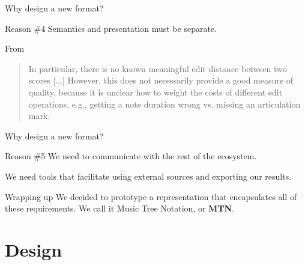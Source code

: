 \documentclass[UKenglish, aspectratio = 169]{beamer}
\begin{document}

\begin{frame}[c]{Why design a new format?}
	\begin{alertblock}{Reason \#4}
		Semantics and presentation must be separate.
	\end{alertblock}
	
	From \cite{calvo-zaragoza_understanding_2021}
	
	\begin{quote}
		In particular, there is no known meaningful edit distance between two 
		scores 
		[...] However, this does not necessarily provide a good measure of quality, 
		because it is unclear how to weight the costs of different edit operations, 
		e.g., getting a note duration wrong vs. missing an articulation mark.
	\end{quote}
\end{frame}


\begin{frame}[c]{Why design a new format?}
	\begin{alertblock}{Reason \#5}
		We need to communicate with the rest of the ecosystem.
	\end{alertblock}
	
	We need tools that facilitate using external sources and exporting our results.
\end{frame}



\begin{frame}[c]{Wrapping up}
	We decided to prototype a representation that encapsulates all of these requirements. 
	We call it Music Tree Notation, or \textbf{MTN}.
\end{frame}


\section{Design}
\SectionPage

\end{document}
